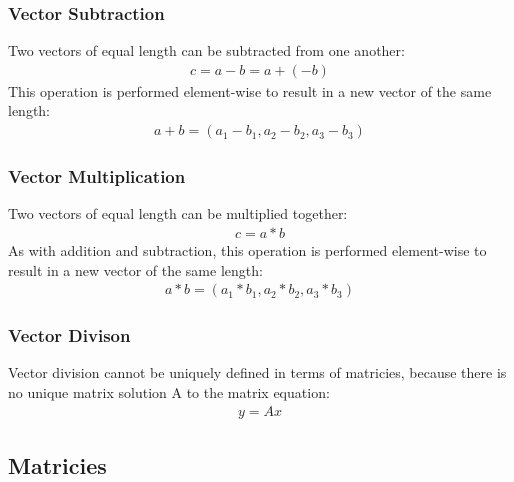 \documentclass{article}
\begin{document}
\subsubsection{Vector Subtraction}
Two vectors of equal length can be subtracted from one another:
\begin{align*}
c = a - b = a + (-b)
\end{align*}
This operation is performed element-wise to result in a new vector of the same length:
\begin{align*}
a + b = (a_1 - b_1, a_2 - b_2, a_3 - b_3)
\end{align*}

\subsubsection{Vector Multiplication}
Two vectors of equal length can be multiplied together:
\begin{align*}
c = a * b
\end{align*}
As with addition and subtraction, this operation is performed element-wise to result in a new vector of the same length:
\begin{align*}
a * b = (a_1 * b_1, a_2 * b_2, a_3 * b_3)
\end{align*}

\subsubsection{Vector Divison}
Vector division cannot be uniquely defined in terms of matricies, because there is no unique matrix solution A to the matrix equation:
\begin{align*}
y = Ax
\end{align*}

\subsection{Matricies}
\end{document}
